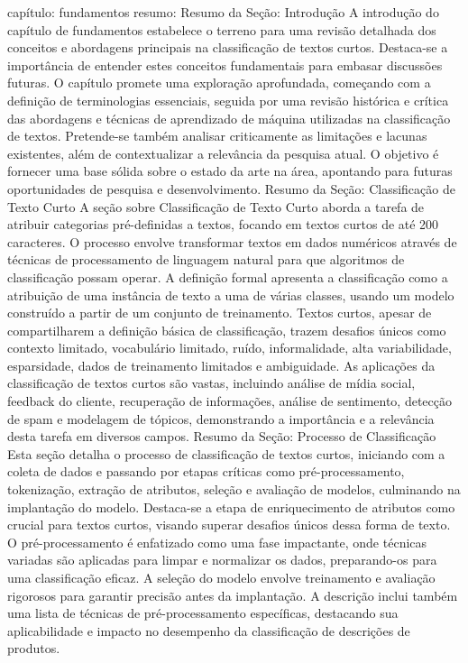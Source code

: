 {
capítulo: fundamentos
resumo: 
Resumo da Seção: Introdução
A introdução do capítulo de fundamentos estabelece o terreno para uma revisão detalhada dos conceitos e abordagens principais na classificação de textos curtos. Destaca-se a importância de entender estes conceitos fundamentais para embasar discussões futuras. O capítulo promete uma exploração aprofundada, começando com a definição de terminologias essenciais, seguida por uma revisão histórica e crítica das abordagens e técnicas de aprendizado de máquina utilizadas na classificação de textos. Pretende-se também analisar criticamente as limitações e lacunas existentes, além de contextualizar a relevância da pesquisa atual. O objetivo é fornecer uma base sólida sobre o estado da arte na área, apontando para futuras oportunidades de pesquisa e desenvolvimento.
Resumo da Seção: Classificação de Texto Curto
A seção sobre Classificação de Texto Curto aborda a tarefa de atribuir categorias pré-definidas a textos, focando em textos curtos de até 200 caracteres. O processo envolve transformar textos em dados numéricos através de técnicas de processamento de linguagem natural para que algoritmos de classificação possam operar. A definição formal apresenta a classificação como a atribuição de uma instância de texto a uma de várias classes, usando um modelo construído a partir de um conjunto de treinamento. Textos curtos, apesar de compartilharem a definição básica de classificação, trazem desafios únicos como contexto limitado, vocabulário limitado, ruído, informalidade, alta variabilidade, esparsidade, dados de treinamento limitados e ambiguidade. As aplicações da classificação de textos curtos são vastas, incluindo análise de mídia social, feedback do cliente, recuperação de informações, análise de sentimento, detecção de spam e modelagem de tópicos, demonstrando a importância e a relevância desta tarefa em diversos campos.
Resumo da Seção: Processo de Classificação
Esta seção detalha o processo de classificação de textos curtos, iniciando com a coleta de dados e passando por etapas críticas como pré-processamento, tokenização, extração de atributos, seleção e avaliação de modelos, culminando na implantação do modelo. Destaca-se a etapa de enriquecimento de atributos como crucial para textos curtos, visando superar desafios únicos dessa forma de texto. O pré-processamento é enfatizado como uma fase impactante, onde técnicas variadas são aplicadas para limpar e normalizar os dados, preparando-os para uma classificação eficaz. A seleção do modelo envolve treinamento e avaliação rigorosos para garantir precisão antes da implantação. A descrição inclui também uma lista de técnicas de pré-processamento específicas, destacando sua aplicabilidade e impacto no desempenho da classificação de descrições de produtos.
}
